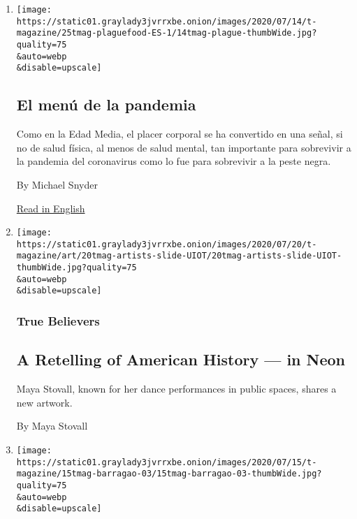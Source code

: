 \begin{enumerate}
\def\labelenumi{\arabic{enumi}.}
\item
  \href{/es/2020/07/23/t-magazine/comida-pandemia.html}{}

  \texttt{[image: https://static01.graylady3jvrrxbe.onion/images/2020/07/14/t-magazine/25tmag-plaguefood-ES-1/14tmag-plague-thumbWide.jpg?quality=75\\\&auto=webp\\\&disable=upscale]}

  \hypertarget{el-menuxfa-de-la-pandemia}{%
  \subsection{El menú de la pandemia}\label{el-menuxfa-de-la-pandemia}}

  Como en la Edad Media, el placer corporal se ha convertido en una
  señal, si no de salud física, al menos de salud mental, tan importante
  para sobrevivir a la pandemia del coronavirus como lo fue para
  sobrevivir a la peste negra.

  By Michael Snyder

  \href{https://www.nytimes3xbfgragh.onion/2020/07/16/t-magazine/eating-food-during-plague.html}{Read
  in English}
\item
  \href{/2020/07/20/t-magazine/maya-stovall.html}{}

  \texttt{[image: https://static01.graylady3jvrrxbe.onion/images/2020/07/20/t-magazine/art/20tmag-artists-slide-UIOT/20tmag-artists-slide-UIOT-thumbWide.jpg?quality=75\\\&auto=webp\\\&disable=upscale]}

  \hypertarget{true-believers-12}{%
  \subsubsection{True Believers}\label{true-believers-12}}

  \hypertarget{a-retelling-of-american-history--in-neon}{%
  \subsection{A Retelling of American History --- in
  Neon}\label{a-retelling-of-american-history--in-neon}}

  Maya Stovall, known for her dance performances in public spaces,
  shares a new artwork.

  By Maya Stovall
\item
  \href{/2020/07/17/t-magazine/summer-recipes-arjamolho-soup-vanessa-barragao.html}{}

  \texttt{[image: https://static01.graylady3jvrrxbe.onion/images/2020/07/15/t-magazine/15tmag-barragao-03/15tmag-barragao-03-thumbWide.jpg?quality=75\\\&auto=webp\\\&disable=upscale]}


\end{enumerate}
